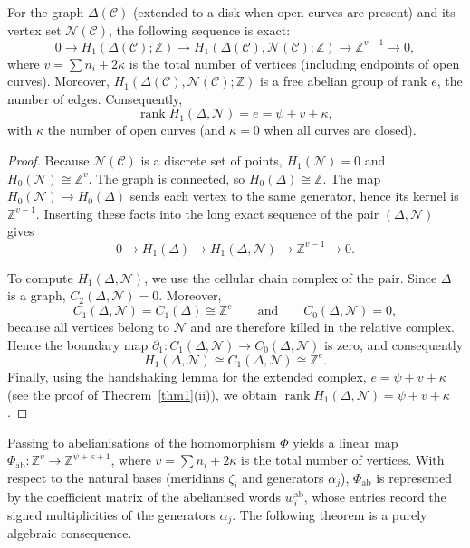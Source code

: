 \documentclass[article,11pt]{amsart} \numberwithin{equation}{section}
\numberwithin{equation}{section}
\begin{document}
{\begin{thm}\label{thm:rel_homology_short_exact}
	For the graph \(\Delta(\mathcal{C})\) (extended to a disk when open curves are present) and its vertex set \(\mathcal{N}(\mathcal{C})\), the following sequence is exact:
	\[
	0 \longrightarrow H_1(\Delta(\mathcal{C});\mathbb{Z}) \longrightarrow H_1(\Delta(\mathcal{C}), \mathcal{N}(\mathcal{C});\mathbb{Z}) \longrightarrow \mathbb{Z}^{v-1} \longrightarrow 0,
	\]
	where \(v = \sum n_i + 2\kappa\) is the total number of vertices (including endpoints of open curves). Moreover, \(H_1(\Delta(\mathcal{C}), \mathcal{N}(\mathcal{C});\mathbb{Z})\) is a free abelian group of rank \(e\), the number of edges. Consequently,
	\[
	\operatorname{rank} H_1(\Delta,\mathcal{N}) = e = \psi + v + \kappa,
	\]
	with \(\kappa\) the number of open curves (and \(\kappa = 0\) when all curves are closed).
\end{thm}

\begin{proof}
	Because \(\mathcal{N}(\mathcal{C})\) is a discrete set of points, \(H_1(\mathcal{N})=0\) and \(H_0(\mathcal{N}) \cong \mathbb{Z}^v\). The graph is connected, so \(H_0(\Delta) \cong \mathbb{Z}\). The map \(H_0(\mathcal{N}) \longrightarrow H_0(\Delta)\) sends each vertex to the same generator, hence its kernel is \(\mathbb{Z}^{v-1}\). Inserting these facts into the long exact sequence of the pair \((\Delta,\mathcal{N})\) gives
	\[
	0 \longrightarrow H_1(\Delta) \longrightarrow H_1(\Delta,\mathcal{N}) \longrightarrow \mathbb{Z}^{v-1} \longrightarrow 0.
	\]
	
	To compute \(H_1(\Delta,\mathcal{N})\), we use the cellular chain complex of the pair. Since \(\Delta\) is a graph, \(C_2(\Delta,\mathcal{N})=0\). Moreover,
	\[
	C_1(\Delta,\mathcal{N}) = C_1(\Delta) \cong \mathbb{Z}^e \qquad\text{and}\qquad C_0(\Delta,\mathcal{N}) = 0,
	\]
	because all vertices belong to \(\mathcal{N}\) and are therefore killed in the relative complex. Hence the boundary map \(\partial_1 : C_1(\Delta,\mathcal{N}) \longrightarrow C_0(\Delta,\mathcal{N})\) is zero, and consequently
	\[
	H_1(\Delta,\mathcal{N}) \cong C_1(\Delta,\mathcal{N}) \cong \mathbb{Z}^e.
	\]
	Finally, using the handshaking lemma for the extended complex, \(e = \psi + v + \kappa\) (see the proof of Theorem~\ref{thm1}(ii)), we obtain \(\operatorname{rank} H_1(\Delta,\mathcal{N}) = \psi + v + \kappa\).
\end{proof}

Passing to abelianisations of the homomorphism \(\Phi\) yields a linear map \(\Phi_{\mathrm{ab}} : \mathbb{Z}^v \to \mathbb{Z}^{\psi+\kappa+1}\), where \(v = \sum n_i + 2\kappa\) is the total number of vertices. With respect to the natural bases (meridians \(\zeta_i\) and generators \(\alpha_j\)), \(\Phi_{\mathrm{ab}}\) is represented by the coefficient matrix of the abelianised words \(w_i^{\mathrm{ab}}\), whose entries record the signed multiplicities of the generators \(\alpha_j\). The following theorem is a purely algebraic consequence.

}
\end{document}
